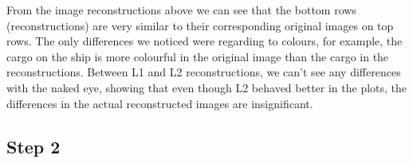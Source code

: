 From the image reconstructions above we can see that the bottom rows (reconstructions) are very similar to their corresponding original images on top rows. The only differences we noticed were regarding to colours, for example, the cargo on the ship is more colourful in the original image than the cargo in the reconstructions. Between L1 and L2 reconstructions, we can't see any differences with the naked eye, showing that even though L2 behaved better in the plots, the differences in the actual reconstructed images are insignificant.

\subsection{Step 2}





